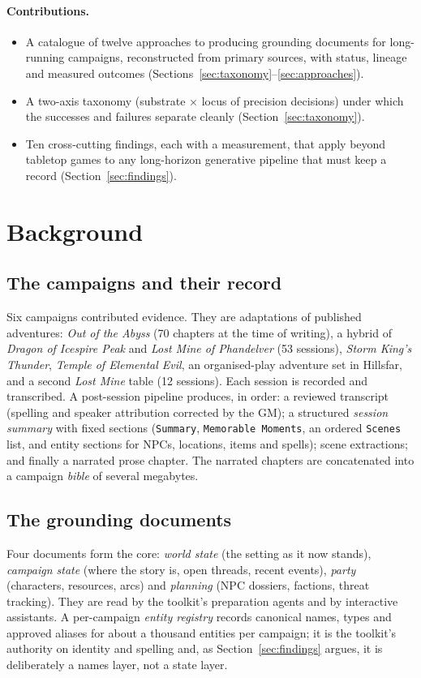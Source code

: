 \documentclass[11pt]{article}
\begin{document}
\paragraph{Contributions.}
\begin{itemize}
  \item A catalogue of twelve approaches to producing grounding documents for long-running campaigns,
        reconstructed from primary sources, with status, lineage and measured outcomes
        (Sections~\ref{sec:taxonomy}--\ref{sec:approaches}).
  \item A two-axis taxonomy (substrate $\times$ locus of precision decisions) under which the
        successes and failures separate cleanly (Section~\ref{sec:taxonomy}).
  \item Ten cross-cutting findings, each with a measurement, that apply beyond tabletop games to any
        long-horizon generative pipeline that must keep a record (Section~\ref{sec:findings}).
\end{itemize}

\section{Background}
\label{sec:background}

\subsection{The campaigns and their record}
Six campaigns contributed evidence. They are adaptations of published adventures: \emph{Out of the
Abyss} (70 chapters at the time of writing), a hybrid of \emph{Dragon of Icespire Peak} and
\emph{Lost Mine of Phandelver} (53 sessions), \emph{Storm King's Thunder}, \emph{Temple of Elemental
Evil}, an organised-play adventure set in Hillsfar, and a second \emph{Lost Mine} table (12
sessions). Each session is recorded and transcribed. A post-session pipeline produces, in order: a
reviewed transcript (spelling and speaker attribution corrected by the GM); a structured
\emph{session summary} with fixed sections (\texttt{Summary}, \texttt{Memorable Moments}, an ordered
\texttt{Scenes} list, and entity sections for NPCs, locations, items and spells); scene extractions;
and finally a narrated prose chapter. The narrated chapters are concatenated into a campaign
\emph{bible} of several megabytes.

\subsection{The grounding documents}
Four documents form the core: \emph{world state} (the setting as it now stands), \emph{campaign
state} (where the story is, open threads, recent events), \emph{party} (characters, resources, arcs)
and \emph{planning} (NPC dossiers, factions, threat tracking). They are read by the toolkit's
preparation agents and by interactive assistants. A per-campaign \emph{entity registry} records
canonical names, types and approved aliases for about a thousand entities per campaign; it is the
toolkit's authority on identity and spelling and, as Section~\ref{sec:findings} argues, it is
deliberately a names layer, not a state layer.
\end{document}
